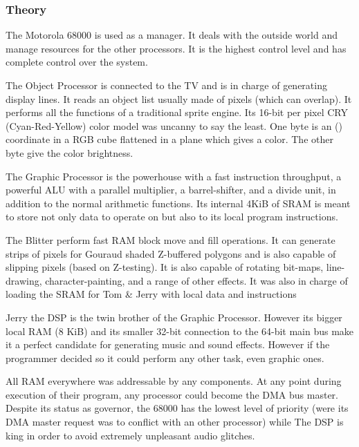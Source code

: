 \subsubsection{Theory}
\par
The Motorola 68000 is used as a manager. It deals with the outside world and manage resources for the other processors. It is the highest control level and has complete control over the system.\\
\par
The Object Processor is connected to the TV and is in charge of generating display lines. It reads an object list usually made of pixels (which can overlap). It performs all the functions of a traditional sprite engine. Its 16-bit per pixel CRY (Cyan-Red-Yellow) color model was uncanny to say the least. One byte is an () coordinate in a RGB cube flattened in a plane which gives a color. The other byte give the color brightness.\\
\par
{}
\par
\pagebreak
\par
{}
\par
The Graphic Processor is the powerhouse with a fast instruction throughput, a powerful ALU with a
parallel multiplier, a barrel-shifter, and a divide unit, in addition to the normal arithmetic functions. Its internal 4KiB of SRAM is meant to store not only data to operate on but also to its local program instructions.\\
\par
The Blitter perform fast RAM block move and fill operations. It can generate strips of pixels for Gouraud shaded Z-buffered polygons and is also capable of slipping pixels (based on Z-testing). It
is also capable of rotating bit-maps, line-drawing, character-painting, and a range of other effects. It was also in charge of loading the SRAM for Tom \& Jerry with local data and instructions\\
\par
Jerry the DSP is the twin brother of the Graphic Processor. However its bigger local RAM (8 KiB) and its smaller 32-bit connection to the 64-bit main bus make it a perfect candidate for generating music and sound effects. However if the programmer decided so it could perform any other task, even graphic ones.\\
\par
All RAM everywhere was addressable by any components. At any point during execution of their program, any processor could become the DMA bus master. Despite its status as governor, the 68000 has the lowest level of priority (were its DMA master request was to conflict with an other processor) while The DSP is king in order to avoid extremely unpleasant audio glitches.\\
\par



